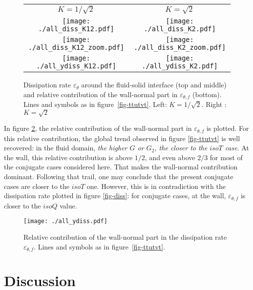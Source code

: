 \documentclass[review]{elsarticle}
\begin{document}
\begin{figure}[htbp]
\centering
\begin{tabular}{cc}
$K=1/\sqrt{2}$ & $K=\sqrt{2}$ \\
\texttt{[image: ./all\_diss\_K12.pdf]} &
\texttt{[image: ./all\_diss\_K2.pdf]} \\
\texttt{[image: ./all\_diss\_K12\_zoom.pdf]} &
\texttt{[image: ./all\_diss\_K2\_zoom.pdf]} \\
\texttt{[image: ./all\_ydiss\_K12.pdf]} &
\texttt{[image: ./all\_ydiss\_K2.pdf]}
\end{tabular}
\caption{Dissipation rate $\varepsilon_\theta$ around the fluid-solid interface (top and middle) and relative contribution of the wall-normal part in $\varepsilon_{\theta,f}$ (bottom). Lines and symbols as in figure~\ref{fig-ttutvt}. Left: $K=1/\sqrt{2}$. Right : $K=\sqrt{2}$}
\label{fig-Kdiss}
\end{figure}

In figure \ref{fig-ydiss}, the relative contribution of the wall-normal part in $\varepsilon_{\theta,f}$ is plotted.
For this relative contribution, the global trend observed in figure \ref{fig-ttutvt} is well recovered: in the fluid domain, \textit{the higher $G$ or $G_2$, the closer to the $isoT$ case}.
At the wall, this relative contribution is above $1/2$, and even above $2/3$ for most of the conjugate cases considered here.
That makes the wall-normal contribution dominant.
Following that trail, one may conclude that the present conjugate cases are closer to the $isoT$ one.
However, this is in contradiction with the dissipation rate plotted in figure \ref{fig-diss}: for conjugate cases, at the wall, $\varepsilon_{\theta,f}$ is closer to the $isoQ$ value.

\begin{figure}[htbp]
\centering
\texttt{[image: ./all\_ydiss.pdf]}
\caption{Relative contribution of the wall-normal part in the dissipation rate $\varepsilon_{\theta,f}$. Lines and symbols as in figure~\ref{fig-ttutvt}.}
\label{fig-ydiss}
\end{figure}

\section{Discussion}

\end{document}

